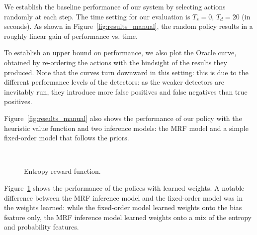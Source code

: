 We establish the baseline performance of our system by selecting actions randomly at each step.
The time setting for our evaluation is $T_s=0$, $T_d=20$ (in seconds).
As shown in Figure~\ref{fig:results_manual}, the random policy results in a roughly linear gain of performance vs. time.

To establish an upper bound on performance, we also plot the Oracle curve, obtained by re-ordering the actions with the hindsight of the results they produced.
Note that the curves turn downward in this setting: this is due to the different performance levels of the detectors: as the weaker detectors are inevitably run, they introduce more false positives and false negatives than true positives.

Figure~\ref{fig:results_manual} also shows the performance of our policy with the heuristic value function and two inference models: the MRF model and a simple fixed-order model that follows the priors.

\begin{figure}[h!]
\centering
{} \\
  \caption{Entropy reward function.}
  \label{fig:results_entropy}
\end{figure}

Figure~\ref{fig:results_entropy} shows the performance of the polices with learned weights.
A notable difference between the MRF inference model and the fixed-order model was in the weights learned: while the fixed-order model learned weights onto the bias feature only, the MRF inference model learned weights onto a mix of the entropy and probability features.

